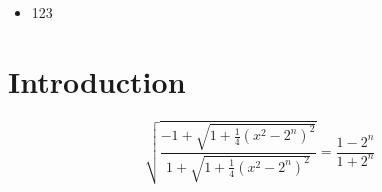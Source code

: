 \documentclass{article}
\begin{document}
\maketitle

\textbf{}
\section{}
\subsection{}

\begin{itemize}
\item 123
\end{itemize}

\section{Introduction}

\begin{equation}
\sqrt{\frac{-1+{\sqrt{1+{\frac{1}{4}}(x^{2}-2^{n})^{2}}}}{1+{\sqrt{1+{\frac{1}{4}}(x^{2}-2^{n})^{2}}}}}={\frac{1-2^{n}}{1+2^{n}}} 
\end{equation}
\end{document}
